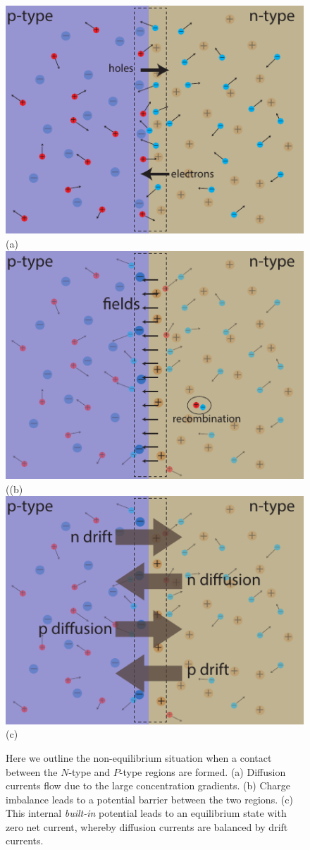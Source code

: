\begin{figure}[H]
\centering
\includegraphics[width=.6\columnwidth]{pn_flow1}\\
(a)\\[0.25cm]
\includegraphics[width=.6\columnwidth]{pn_flow2}\\
((b)\\[0.25cm]
\includegraphics[width=.6\columnwidth]{pn_flow3}\\
(c)\\[0.25cm]
\caption{Here we outline the non-equilibrium situation when a contact between the $N$-type and $P$-type regions are formed.  (a)  Diffusion currents flow due to the large concentration gradients.  (b)  Charge imbalance leads to a potential barrier between the two regions.  (c) This internal \emph{built-in} potential leads to an equilibrium state with zero net current, whereby diffusion currents are balanced by drift currents.}
\label{fig:slide9}
\end{figure}
\newpage
